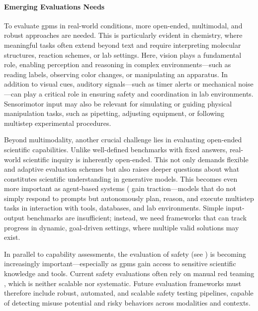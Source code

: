 \paragraph{Emerging Evaluations Needs} To evaluate \glspl{gpm} in real-world conditions, more open-ended, multimodal, and robust approaches are needed. This is particularly evident in chemistry, where meaningful tasks often extend beyond text and require interpreting molecular structures, reaction schemes, or lab settings.
Here, vision plays a fundamental role, enabling perception and reasoning in complex environments---such as reading labels, observing color changes, or manipulating an apparatus. \autocite{Eppel2020computer}
In addition to visual cues, auditory signals---such as timer alerts or mechanical noise---can play a critical role in ensuring safety and coordination in lab environments. 
Sensorimotor input may also be relevant for simulating or guiding physical manipulation tasks, such as pipetting, adjusting equipment, or following multistep experimental procedures.


Beyond multimodality, another crucial challenge lies in evaluating open-ended scientific capabilities. 
Unlike well-defined benchmarks with fixed answers, real-world scientific inquiry is inherently open-ended.\autocite{mitchener2025bixbench0} This not only demands flexible and adaptive evaluation schemes but also raises deeper questions about what constitutes scientific understanding in generative models. 
This becomes even more important as agent-based systems ( gain traction---models that do not simply respond to prompts but autonomously plan, reason, and execute multistep tasks in interaction with tools, databases, and lab environments. \autocite{cao2024agents, mandal2024autonomous}
Simple input-output benchmarks are insufficient; instead, we need frameworks that can track progress in dynamic, goal-driven settings, where multiple valid solutions may exist. 

In parallel to capability assessments, the evaluation of safety (see ) is becoming increasingly important---especially as \glspl{gpm} gain access to sensitive scientific knowledge and tools.\autocite{bran2024augmenting, boiko2023autonomous} 
Current safety evaluations often rely on manual red teaming , which is neither scalable nor systematic. 
Future evaluation frameworks must therefore include robust, automated, and scalable safety testing pipelines, capable of detecting misuse potential and risky behaviors across modalities and contexts.\autocite{goldstein2023generative}

